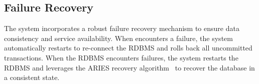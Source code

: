 \subsection{Failure Recovery \label{sec:proof:failure}}
The system incorporates a robust failure recovery mechanism to ensure data consistency and service availability. When \sysname encounters a failure, the system automatically restarts \sysname to re-connect the RDBMS and rolls back all uncommitted transactions. When the RDBMS encounters failures, the system restarts the RDBMS and leverages the ARIES recovery algorithm~\cite{DBLP:journals/tods/MohanHLPS92:ARIES} to recover the database in a consistent state. 




